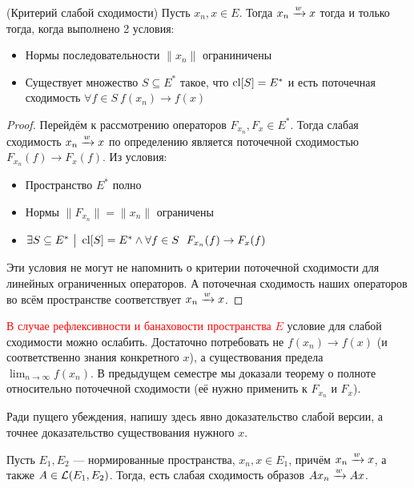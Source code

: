 \begin{theorem} (Критерий слабой сходимости)
	Пусть $x_n, x \in E$. Тогда $x_n \xrightarrow{w} x$ тогда и только тогда, когда выполнено 2 условия:
	\begin{itemize}
		\item Нормы последовательности $\|x_n\|$ ограниничены
		
		\item Существует множество $S \subseteq E^*$ такое, что $\operatorname{cl} [S] = E^*$ и есть поточечная сходимость $\forall f \in S\ f(x_n) \to f(x)$
	\end{itemize}
\end{theorem}

\begin{proof}
	Перейдём к рассмотрению операторов $F_{x_n}, F_x \in E^*$. Тогда слабая сходимость $x_n \xrightarrow{w} x$ по определению является поточечной сходимостью $F_{x_n}(f) \to F_x(f)$. Из условия:
	\begin{itemize}
		\item Пространство $E^*$ полно
		
		\item Нормы $\|F_{x_n}\| = \|x_n\|$ ограничены
		
		\item $\exists S \subseteq E^* \ \big|\  \operatorname{cl} [S] = E^* \wedge \forall f \in S\ \ F_{x_n}(f) \to F_x(f)$
	\end{itemize}
	Эти условия не могут не напомнить о критерии поточечной сходимости для линейных ограниченных операторов. А поточечная сходимость наших операторов во всём пространстве соответствует $x_n \xrightarrow{w} x$.
\end{proof}

\begin{note}
	\textcolor{red}{В случае рефлексивности и банаховости пространства $E$} условие для слабой сходимости можно ослабить. Достаточно потребовать не $f(x_n) \to f(x)$ (и соответственно знания конкретного $x$), а существования предела $\lim_{n \to \infty} f(x_n)$. В предыдущем семестре мы доказали теорему о полноте относительно поточечной сходимости (её нужно применить к $F_{x_n}$ и $F_x$).
\end{note}

\begin{anote}
	Ради пущего убеждения, напишу здесь явно доказательство слабой версии, а точнее доказательство существования нужного $x$.
\end{anote}

\begin{theorem}
	Пусть $E_1, E_2$ --- нормированные пространства, $x_n, x \in E_1$, причём $x_n \xrightarrow{w} x$, а также $A \in \mathcal{L}(E_1, E_2)$. Тогда, есть слабая сходимость образов $Ax_n \xrightarrow{w} Ax$.
\end{theorem}

